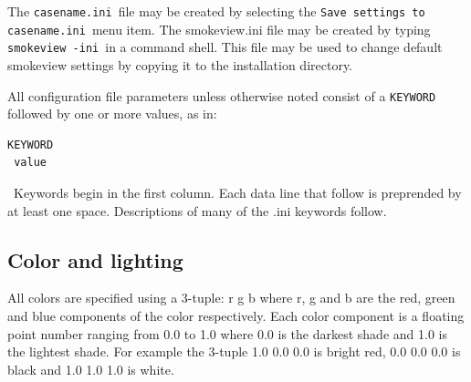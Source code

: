 \documentclass[11pt,twoside]{book}
\begin{document}
The {\tt casename.ini}\ file may be created by selecting the {\tt Save settings to casename.ini}\ menu item.
The smokeview.ini file may be created by typing {\tt smokeview -ini}\ in a command shell.
This file may be used to change default smokeview settings by copying it
to the installation directory.

All configuration file parameters unless otherwise noted consist of a {\tt KEYWORD}
followed by one or more values, as in:
\begin{lstlisting}
KEYWORD
 value
\end{lstlisting}
\ Keywords begin in the first column.
Each data line that follow is preprended by at least one space.
Descriptions of many of the .ini keywords follow.





\subsection{Color and lighting}
All colors are specified using a 3-tuple: r g b
where r, g and b are the red, green and blue components of the color respectively.
Each color component is a floating point number ranging
from 0.0 to 1.0 where 0.0 is the darkest shade and 1.0 is the
lightest shade.  For example the 3-tuple 1.0 0.0 0.0 is bright red, 0.0 0.0 0.0 is black and
1.0 1.0 1.0 is white.
\end{document}

